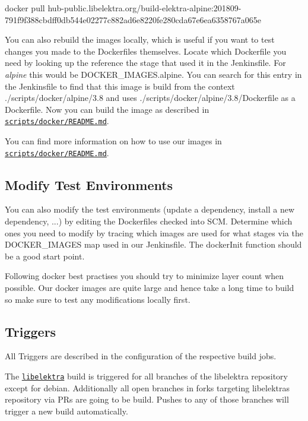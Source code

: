 \begin{DoxyCode}
docker pull
       hub-public.libelektra.org/build-elektra-alpine:201809-791f9f388cbdff0db544e02277c882ad6e8220fe280cda67e6ea6358767a065e
\end{DoxyCode}


You can also rebuild the images locally, which is useful if you want to test changes you made to the Dockerfiles themselves. Locate which Dockerfile you need by looking up the reference the stage that used it in the Jenkinsfile. For {\itshape alpine} this would be {\ttfamily D\+O\+C\+K\+E\+R\+\_\+\+I\+M\+A\+G\+E\+S.\+alpine}. You can search for this entry in the Jenkinsfile to find that this image is build from the context {\ttfamily ./scripts/docker/alpine/3.8} and uses {\ttfamily ./scripts/docker/alpine/3.8/\+Dockerfile} as a Dockerfile. Now you can build the image as described in \href{https://master.libelektra.org/scripts/docker/README.md#building-images-locally}{\tt scripts/docker/\+R\+E\+A\+D\+M\+E.\+md}.

You can find more information on how to use our images in \href{https://master.libelektra.org/scripts/docker/README.md#testing-elektra-via-docker-images}{\tt scripts/docker/\+R\+E\+A\+D\+M\+E.\+md}.

\subsection*{Modify Test Environments}

You can also modify the test environments (update a dependency, install a new dependency, ...) by editing the Dockerfiles checked into S\+CM. Determine which ones you need to modify by tracing which images are used for what stages via the {\ttfamily D\+O\+C\+K\+E\+R\+\_\+\+I\+M\+A\+G\+ES} map used in our Jenkinsfile. The {\ttfamily docker\+Init} function should be a good start point.

Following docker best practises you should try to minimize layer count when possible. Our docker images are quite large and hence take a long time to build so make sure to test any modifications locally first.

\subsection*{Triggers}

All Triggers are described in the configuration of the respective build jobs.

The \href{https://build.libelektra.org/jenkins/job/libelektra/}{\tt libelektra} build is triggered for all branches of the libelektra repository except for {\ttfamily debian}. Additionally all open branches in forks targeting libelektra\textquotesingle{}s repository via P\+Rs are going to be build. Pushes to any of those branches will trigger a new build automatically.


